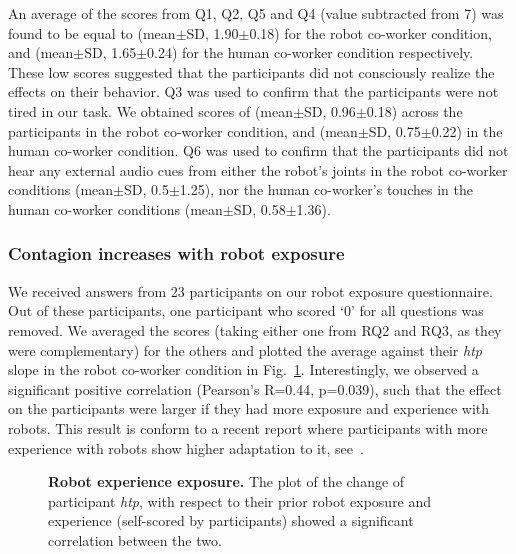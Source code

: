 \documentclass[a4paper, 12pt, oneside]{Thesis}  %
\begin{document}
An average of the scores from Q1, Q2, Q5 and Q4 (value subtracted from 7) was found to be equal to (mean$\pm$SD, 1.90$\pm$0.18) for the robot co-worker condition, and (mean$\pm$SD, 1.65$\pm$0.24) for the human co-worker condition respectively. These low scores suggested that the participants did not consciously realize the effects on their behavior. Q3 was used to confirm that the participants were not tired in our task. We obtained scores of (mean$\pm$SD, 0.96$\pm$0.18) across the participants in the robot co-worker condition, and (mean$\pm$SD, 0.75$\pm$0.22) in the human co-worker condition. Q6 was used to confirm that the participants did not hear any external audio cues from either the robot's joints in the robot co-worker conditions (mean$\pm$SD, 0.5$\pm$1.25), nor the human co-worker's touches in the human co-worker conditions (mean$\pm$SD, 0.58$\pm$1.36).

\subsubsection{Contagion increases with robot exposure}

We received answers from 23 participants on our robot exposure questionnaire. Out of these participants, one participant who scored `0' for all questions was removed. We averaged the scores (taking either one from RQ2 and RQ3, as they were complementary) for the others and plotted the average against their {\it htp} slope in the robot co-worker condition in Fig.~\ref{fig:corelation}. Interestingly, we observed a significant positive correlation (Pearson's R=0.44, p=0.039), such that the effect on the participants were larger if they had more exposure and experience with robots. This result is conform to a recent report where participants with more experience with robots show higher adaptation to it, see~\cite{vannucci:roman:2017}.


\begin{figure}[hpt]
	\caption{{\bf Robot experience exposure.} The plot of the change of participant {\it htp}, with respect to their prior robot exposure and experience (self-scored by participants) showed a significant correlation between the two.}
	\label{fig:corelation}
\end{figure}
\end{document}
